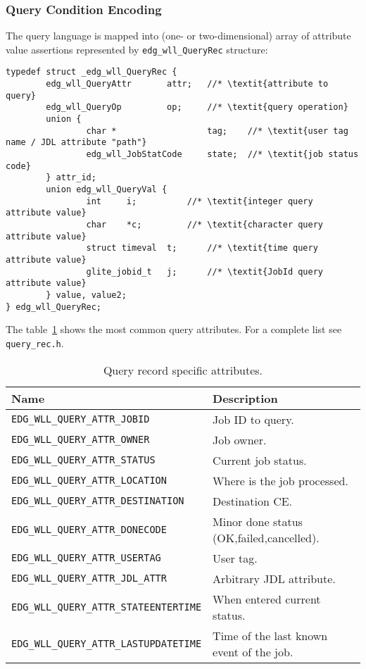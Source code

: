\subsubsection{Query Condition Encoding}
The \LB query language is mapped into (one- or two-dimensional) array
of attribute value assertions represented by
\verb'edg_wll_QueryRec' structure:
\begin{lstlisting}
typedef struct _edg_wll_QueryRec {
        edg_wll_QueryAttr       attr;   //* \textit{attribute to query}
        edg_wll_QueryOp         op;     //* \textit{query operation}
        union {
                char *                  tag;    //* \textit{user tag name / JDL attribute "path"}
                edg_wll_JobStatCode     state;  //* \textit{job status code}
        } attr_id;
        union edg_wll_QueryVal {
                int     i;      	//* \textit{integer query attribute value}
                char    *c;     	//* \textit{character query attribute value}
                struct timeval  t;      //* \textit{time query attribute value}
                glite_jobid_t   j;      //* \textit{JobId query attribute value}
        } value, value2;
} edg_wll_QueryRec;
\end{lstlisting}


The table~\ref{t:cqueryattr} shows the most common query attributes.
For a complete list see \texttt{query\_rec.h}.

\begin{table}[ht]
\begin{tabularx}{\textwidth}{lX}
{\bf Name} & {\bf Description} \\
\hline
\lstinline'EDG_WLL_QUERY_ATTR_JOBID' & Job ID to query. \\
\lstinline'EDG_WLL_QUERY_ATTR_OWNER' & Job owner. \\
\lstinline'EDG_WLL_QUERY_ATTR_STATUS' & Current job status. \\
\lstinline'EDG_WLL_QUERY_ATTR_LOCATION' & Where is the job processed. \\
\lstinline'EDG_WLL_QUERY_ATTR_DESTINATION' & Destination CE. \\
\lstinline'EDG_WLL_QUERY_ATTR_DONECODE' & Minor done status (OK,failed,cancelled). \\
\lstinline'EDG_WLL_QUERY_ATTR_USERTAG' & User tag. \\
\lstinline'EDG_WLL_QUERY_ATTR_JDL_ATTR' & Arbitrary JDL attribute. \\
\lstinline'EDG_WLL_QUERY_ATTR_STATEENTERTIME' & When entered current status. \\
\lstinline'EDG_WLL_QUERY_ATTR_LASTUPDATETIME' & Time of the last known event of the job. \\
\end{tabularx}
\caption{Query record specific attributes.}
\label{t:cqueryattr}
\end{table}

